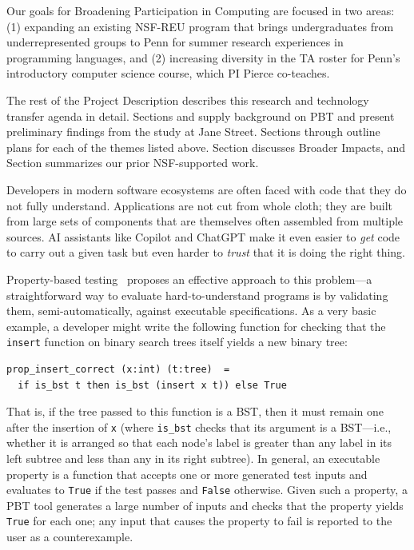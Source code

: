 %
Our goals for Broadening Participation in Computing are focused in two
areas: (1) expanding an
existing NSF-REU program that brings undergraduates from
underrepresented groups to Penn for summer research experiences in
programming languages, and (2) increasing diversity in the TA roster
for Penn's introductory computer science course, which PI Pierce
co-teaches.

\medskip

The rest of the Project Description describes this research and
technology transfer agenda in detail.  Sections
 and  supply
background on PBT and present preliminary findings from the
study at Jane Street.
%
Sections  through
 outline plans for each of the
themes listed above.
Section 
discusses Broader Impacts, and
Section  summarizes our prior
NSF-supported work.

Developers in modern software ecosystems are often faced with code
that they do not fully understand. Applications are not cut from whole cloth;
they are built from large sets of components that are themselves often
assembled from multiple sources.
AI assistants like Copilot and ChatGPT make it even
easier to {\em get} code to carry out a given task but even harder to
{\em trust} that it is doing the right thing.

Property-based testing~\cite{hughes_quickcheck_2007} proposes an
effective approach to this problem---a straightforward way to evaluate
hard-to-understand programs is by validating them, semi-automatically,
against executable specifications. As a very basic example, a
developer might write the following function for checking that
the \lstinline{insert} function on binary search trees itself yields a new
binary tree:
\begin{lstlisting}
prop_insert_correct (x:int) (t:tree)  =
  if is_bst t then is_bst (insert x t)) else True
\end{lstlisting}
That is, if the tree passed to this function
is a BST, then it must remain
one after the insertion of \texttt{x} (where
\lstinline{is_bst} checks that its argument is a BST---i.e., whether it
is arranged so that each node's label is greater
than any label in its left subtree and less than any in its right
subtree).
%
In general, an executable property is a function that
accepts one or more generated
test inputs
and evaluates to \lstinline{True} if the test passes and
\lstinline{False} otherwise.
Given such a property, a PBT tool generates a
large number of inputs and
checks that the property yields \lstinline{True} for each one; any input
that causes the property to fail is reported to the user as a
{counterexample}.
%
 

